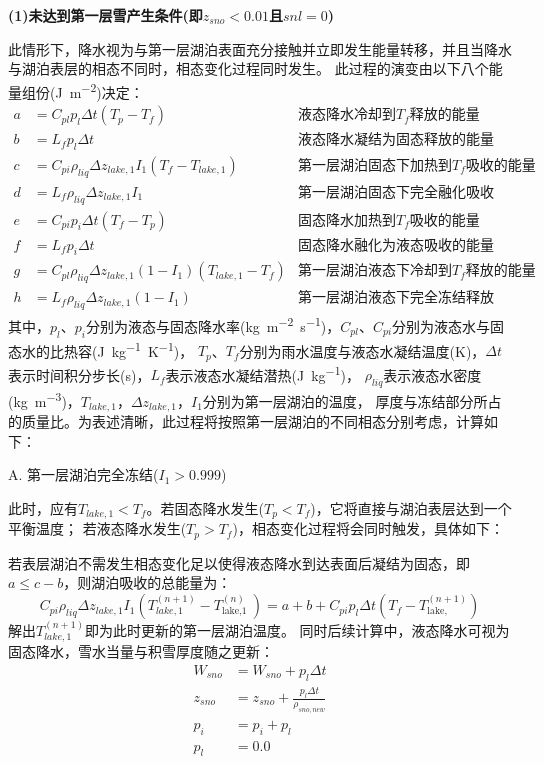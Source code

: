 \noindent\textbf {(1)未达到第一层雪产生条件(即$z_{sno}<0.01$且$snl=0$)}

此情形下，降水视为与第一层湖泊表面充分接触并立即发生能量转移，并且当降水与湖泊表层的相态不同时，相态变化过程同时发生。
此过程的演变由以下八个能量组份(\unit{J.m^{-2}})决定：
\begin{align*}
a &= C_{pl} p_{l} \Delta t\left(T_{p}-T_{f}\right)   & \text{液态降水冷却到$T_f$释放的能量} \\
b &= L_f p_l \Delta t                                           & \text{液态降水凝结为固态释放的能量} \\
c &= C_{pi} \rho_{liq} \Delta z_{lake, 1} I_{1}\left(T_f-T_{lake, 1}\right)  & \text{第一层湖泊固态下加热到$T_f$吸收的能量} \\
d &= L_f \rho_{liq} \Delta z_{lake, 1} I_{1}         & \text{第一层湖泊固态下完全融化吸收的能量} \\
e &= C_{pi} p_i \Delta t\left(T_f -T_p\right)        & \text{固态降水加热到$T_f$吸收的能量} \\
f &= L_f p_i \Delta t                                           & \text{固态降水融化为液态吸收的能量} \\
g &= C_{pl} \rho_{liq} \Delta z_{lake, 1}\left(1-I_{1}\right)\left(T_{lake, 1}-T_f\right)  & \text{第一层湖泊液态下冷却到$T_f$释放的能量} \\
h &= L_f \rho_{liq} \Delta z_{lake, 1}\left(1-I_{1}\right)  & \text{第一层湖泊液态下完全冻结释放的能量}
\end{align*}
其中，$p_l$、$p_i$分别为液态与固态降水率(\unit{kg.m^{-2}.s^{-1}})，$C_{pl}$、$C_{pi}$分别为液态水与固态水的比热容(\unit{J.kg^{-1}.K^{-1}})，
$T_p$、$T_f$分别为雨水温度与液态水凝结温度(K)，$\Delta t$表示时间积分步长(s)，$L_f$表示液态水凝结潜热(\unit{J.kg^{-1}})，
$\rho_{liq}$表示液态水密度(\unit{kg.m^{-3}})，$T_{lake,1}$，$\Delta z_{lake,1}$，$I_1$分别为第一层湖泊的温度，
厚度与冻结部分所占的质量比。为表述清晰，此过程将按照第一层湖泊的不同相态分别考虑，计算如下：

A. 第一层湖泊完全冻结($I_1>0.999$)

此时，应有$T_{lake,1}<T_f$。若固态降水发生($T_p<T_f$)，它将直接与湖泊表层达到一个平衡温度；
若液态降水发生($T_p>T_f$)，相态变化过程将会同时触发，具体如下：

若表层湖泊不需发生相态变化足以使得液态降水到达表面后凝结为固态，即$a\leqslant c-b$，则湖泊吸收的总能量为：
\begin{equation}
C_{pi} \rho_{liq} \Delta z_{lake,1} I_{1}\left(T_{lake, 1}^{(n+1)}-T_{\text {lake,1 }}^{(n)}\right)=a+b+C_{pi} p_{l} \Delta t\left(T_{f}-T_{\text {lake, }}^{(n+1)}\right)
\end{equation}
解出$T_{lake,1}^{\left(n+1\right)}$即为此时更新的第一层湖泊温度。
同时后续计算中，液态降水可视为固态降水，雪水当量与积雪厚度随之更新：
\begin{equation}
\begin{aligned}
W_{sno} &= W_{sno}+p_l \Delta t \\ 
z_{sno} &= z_{sno}+\frac{p_l \Delta t}{\rho_{sno,new}} \\ 
p_i &= p_i + p_l \\ 
p_l &= 0.0
\end{aligned}
\end{equation}


